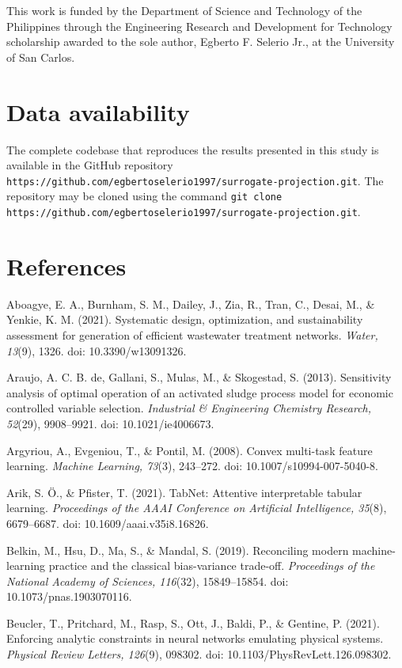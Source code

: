 \documentclass[a4paper,fleqn]{cas-sc}
\begin{document}
This work is funded by the Department of Science and Technology of the Philippines through the Engineering Research and Development for Technology scholarship awarded to the sole author, Egberto F. Selerio Jr., at the University of San Carlos.

\section*{Data availability}

The complete codebase that reproduces the results presented in this study is available in the GitHub repository \texttt{https://github.com/egbertoselerio1997/surrogate-projection.git}. The repository may be cloned using the command \texttt{git clone https://github.com/egbertoselerio1997/surrogate-projection.git}.

\section*{References}

\noindent Aboagye, E. A., Burnham, S. M., Dailey, J., Zia, R., Tran, C., Desai, M., \& Yenkie, K. M. (2021). Systematic design, optimization, and sustainability assessment for generation of efficient wastewater treatment networks. \textit{Water, 13}(9), 1326. doi: 10.3390/w13091326.

\noindent Araujo, A. C. B. de, Gallani, S., Mulas, M., \& Skogestad, S. (2013). Sensitivity analysis of optimal operation of an activated sludge process model for economic controlled variable selection. \textit{Industrial \& Engineering Chemistry Research, 52}(29), 9908--9921. doi: 10.1021/ie4006673.

\noindent Argyriou, A., Evgeniou, T., \& Pontil, M. (2008). Convex multi-task feature learning. \textit{Machine Learning, 73}(3), 243--272. doi: 10.1007/s10994-007-5040-8.

\noindent Arik, S. \"O., \& Pfister, T. (2021). TabNet: Attentive interpretable tabular learning. \textit{Proceedings of the AAAI Conference on Artificial Intelligence, 35}(8), 6679--6687. doi: 10.1609/aaai.v35i8.16826.

\noindent Belkin, M., Hsu, D., Ma, S., \& Mandal, S. (2019). Reconciling modern machine-learning practice and the classical bias-variance trade-off. \textit{Proceedings of the National Academy of Sciences, 116}(32), 15849--15854. doi: 10.1073/pnas.1903070116.

\noindent Beucler, T., Pritchard, M., Rasp, S., Ott, J., Baldi, P., \& Gentine, P. (2021). Enforcing analytic constraints in neural networks emulating physical systems. \textit{Physical Review Letters, 126}(9), 098302. doi: 10.1103/PhysRevLett.126.098302.
\end{document}
